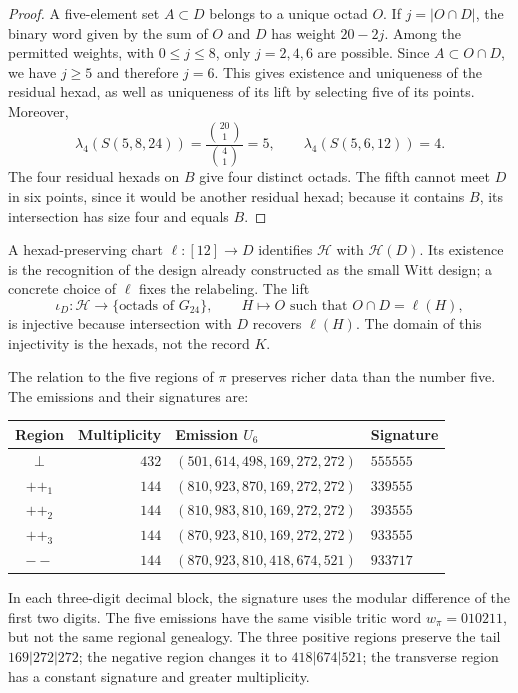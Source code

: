 \begin{proof}
A five-element set $A\subset D$ belongs to a unique octad $O$. If
$j=|O\cap D|$, the binary word given by the sum of $O$ and $D$ has weight
$20-2j$. Among the permitted weights, with $0\leq j\leq8$, only
$j=2,4,6$ are possible. Since $A\subset O\cap D$, we have $j\geq5$
and therefore $j=6$. This gives existence and uniqueness of the residual
hexad, as well as uniqueness of its lift by selecting five of its
points. Moreover,
\[
 \lambda_4(S(5,8,24))=\frac{\binom{20}1}{\binom41}=5,
 \qquad
 \lambda_4(S(5,6,12))=4.
\]
The four residual hexads on $B$ give four distinct octads.
The fifth cannot meet $D$ in six points, since it would be another residual
hexad; because it contains $B$, its intersection has size four and
equals $B$.
\end{proof}

A hexad-preserving chart $\ell:[12]\to D$ identifies
$\mathcal H$ with $\mathcal H(D)$. Its existence is the recognition
of the design already constructed as the small Witt design; a concrete
choice of $\ell$ fixes the relabeling. The lift
\[
 \iota_D:\mathcal H\longrightarrow
       \{\text{octads of }G_{24}\},
 \qquad H\longmapsto O\text{ such that }O\cap D=\ell(H),
\]
is injective because intersection with $D$ recovers $\ell(H)$.
The domain of this injectivity is the hexads, not the record $K$.

The relation to the five regions of $\pi$ preserves richer data
than the number five. The emissions and their signatures are:
\begin{center}
\small
\begin{tabular}{@{}crll@{}}
\toprule
Region & Multiplicity & Emission $U_6$ & Signature \\
\midrule
$\perp$ & $432$ & $(501,614,498,169,272,272)$ & $555555$ \\
$++_1$ & $144$ & $(810,923,870,169,272,272)$ & $339555$ \\
$++_2$ & $144$ & $(810,983,810,169,272,272)$ & $393555$ \\
$++_3$ & $144$ & $(870,923,810,169,272,272)$ & $933555$ \\
$--$ & $144$ & $(870,923,810,418,674,521)$ & $933717$ \\
\bottomrule
\end{tabular}
\end{center}
In each three-digit decimal block, the signature uses the modular
difference of the first two digits. The five emissions have the
same visible tritic word $w_\pi=010211$, but not the same
regional genealogy. The three positive regions preserve the tail
$169|272|272$; the negative region changes it to $418|674|521$;
the transverse region has a constant signature and greater multiplicity.

